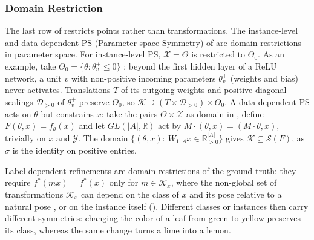 \documentclass[mathematics,review,submit,moreauthors]{Definitions/mdpi}
\begin{document}
\subsubsection{Domain Restriction}\label{sec:domain-restriction}
The last row of  restricts points rather than transformations.
The instance-level and data-dependent PS (Parameter-space Symmetry) of  are domain restrictions in parameter space.
For instance-level PS, $\mathcal X=\Theta$ is restricted to $\Theta_0$.
As an example, take $\Theta_0=\{\theta:\theta^+_v\le0\}$ \citep{grigsby2023p4icml}: beyond the first hidden layer of a ReLU network, a unit $v$ with non-positive incoming parameters $\theta^+_v$ (weights and bias) never activates.
Translations $T$ of its outgoing weights and positive diagonal scalings $\mathcal D_{>0}$ of $\theta^+_v$ preserve $\Theta_0$, so $\mathcal K\supseteq(T\times\mathcal D_{>0})\times\Theta_0$.
A data-dependent PS acts on $\theta$ but constrains $x$: take the pairs $\Theta\times\mathcal X$ as domain in , define $F(\theta,x)=f_\theta(x)$ and let $GL(|A|,\mathbb R)$ act by $M\cdot(\theta,x)=(M\cdot\theta,x)$, trivially on $x$ and $\mathcal Y$.
The domain $\{(\theta,x):\ W_{1,A}x\in\mathbb R^{|A|}_{>0}\}$ gives $\mathcal K\subseteq\mathcal S(F)$, as $\sigma$ is the identity on positive entries.

Label-dependent refinements are domain restrictions of the ground truth: they require $f^*(mx)=f^*(x)$ only for $m\in\mathcal K_x$, where the non-global set of transformations $\mathcal K_x$ can depend on the class of $x$ and its pose relative to a natural pose \citep{urbano2026}, or on the instance itself \citep{wang2023a,miao2023p4icml} ().
Different classes or instances then carry different symmetries: changing the color of a leaf from green to yellow preserves its class, whereas the same change turns a lime into a lemon.
\end{document}
